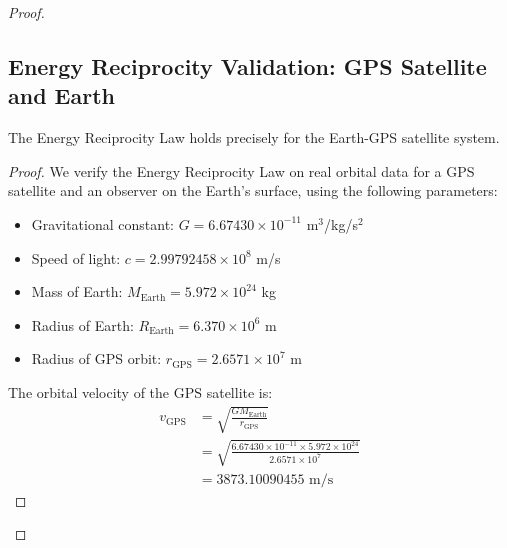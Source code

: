\documentclass{article}
\begin{document}
\begin{theorem}
\begin{proof}
\subsection{Energy Reciprocity Validation: GPS Satellite and Earth}

\begin{theorem}
The Energy Reciprocity Law holds precisely for the Earth-GPS satellite system.
\end{theorem}

\begin{proof}
We verify the Energy Reciprocity Law on real orbital data for a GPS satellite and an observer on the Earth's surface, using the following parameters:
\begin{itemize}
\item Gravitational constant: $G = 6.67430 \times 10^{-11}$ m$^3$/kg/s$^2$
\item Speed of light: $c = 2.99792458 \times 10^8$ m/s
\item Mass of Earth: $M_{\text{Earth}} = 5.972 \times 10^{24}$ kg
\item Radius of Earth: $R_{\text{Earth}} = 6.370 \times 10^6$ m
\item Radius of GPS orbit: $r_{\text{GPS}} = 2.6571 \times 10^7$ m
\end{itemize}

The orbital velocity of the GPS satellite is:
\begin{align}
v_{\text{GPS}} &= \sqrt{\frac{GM_{\text{Earth}}}{r_{\text{GPS}}}} \\
&= \sqrt{\frac{6.67430 \times 10^{-11} \times 5.972 \times 10^{24}}{2.6571 \times 10^7}} \\
&= 3873.10090455 \text{ m/s}
\end{align}


\end{proof}
\end{proof}
\end{theorem}
\end{document}
